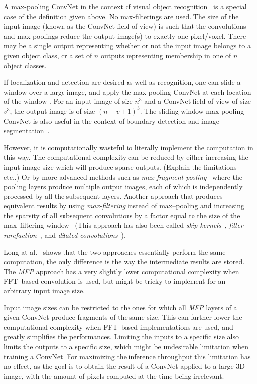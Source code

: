 \documentclass[conference]{IEEEtran}
\begin{document}
  A max-pooling ConvNet in the context of visual object
  recognition~\cite{krizhevsky2012imagenet} is a special case of the
  definition given above.  No max-filterings are used.  The size of
  the input image (known as the ConvNet field of view) is such that
  the convolutions and max-poolings reduce the output image(s) to
  exactly one pixel/voxel.  There may be a single output representing
  whether or not the input image belongs to a given object class, or a
  set of $n$ outputs representing membership in one of $n$ object
  classes.

  If localization and detection are desired as well as recognition,
  one can slide a window over a large image, and apply the max-pooling
  ConvNet at each location of the window
  \cite{sermanet2013overfeat}. For an input image of size $n^3$ and a
  ConvNet field of view of size $v^3$, the output image is of size
  $(n-v+1)^3$.  The sliding window max-pooling ConvNet is also useful
  in the context of boundary detection and image
  segmentation~\cite{ciresan2012deep}.

  However, it is computationally wasteful to literally implement the
  computation in this way.  The computational complexity can be
  reduced by either increasing the input image size which will produce
  sparse outputs. (Explain the limitations etc..) Or by more advanced
  methods such as
  \emph{max-fragment-pooling}~\cite{giusti2013fast,masci2013fast}
  where the pooling layers produce multiple output images, each of
  which is independently processed by all the subsequent layers.
  Another approach that produces equivalent results by using
  \emph{max-filtering} instead of max--pooling and increasing the
  sparsity of all subsequent convolutions by a factor equal to the
  size of the max--filtering window~\cite{zlateski2015znn} (This
  approach has also been called
  \emph{skip-kernels}~\cite{sermanet2013overfeat}, \emph{filter
    rarefaction}~\cite{long2015fully}, and \emph{dilated
    convolutions}~\cite{yu2015multi}).

  Long at al.~\cite{long2015fully} shows that the two approaches
  essentially perform the same computation, the only difference is the
  way the intermediate results are stored.  The \emph{MFP} approach
  has a very slightly lower computational complexity when FFT--based
  convolution is used, but might be tricky to implement for an
  arbitrary input image size.

  Input image sizes can be restricted to the ones for which all
  \emph{MFP} layers of a given ConvNet produce fragments of the same
  size.  This can further lower the computational complexity when
  FFT--based implementations are used, and greatly simplifies the
  performances.  Limiting the inputs to a specific size also limits
  the outputs to a specific size, which might be undesirable
  limitation when training a ConvNet.  For maximizing the inference
  throughput this limitation has no effect, as the goal is to obtain
  the result of a ConvNet applied to a large 3D image, with the amount
  of pixels computed at the time being irrelevant.
\end{document}

